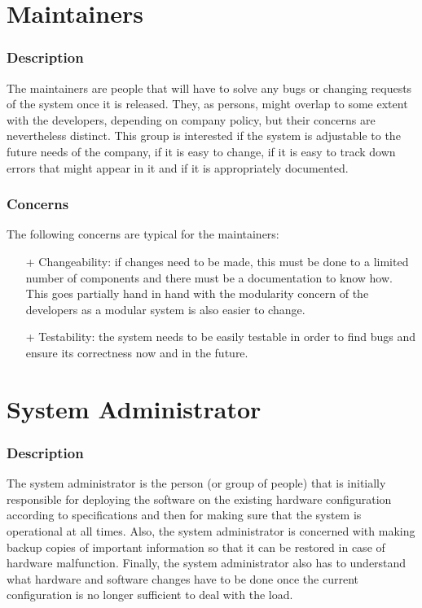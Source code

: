 \section{Maintainers}

\subsubsection{Description}
The maintainers are people that will have to solve any bugs or changing
requests of the system once it is released. They, as persons, might overlap
to some extent with the developers, depending on company policy, but
their concerns are nevertheless distinct. This group is interested if the
system is adjustable to the future needs of the company, if it is easy to
change, if it is easy to track down errors that might appear in it and if it
is appropriately documented.

\subsubsection{Concerns}
The following concerns are typical for the maintainers:
\begin{itemize}
\item[+] Changeability: if changes need to be made, this must
be done to a limited number of components and there must be a
documentation to know how. This goes partially hand in hand with the
modularity concern of the developers as a modular system is also easier
to change.
\item[+] Testability: the system needs to be easily testable in order to
find bugs and ensure its correctness now and in the future.
\end{itemize}

\section{System Administrator}

\subsubsection{Description}
The system administrator is the person (or group of people) that
is initially responsible for deploying the software on the existing hardware
configuration according to specifications and then for making sure that
the system is operational at all times. Also, the system administrator
is concerned with making backup copies of important information
so that it can be restored in case of hardware malfunction. Finally,
the system administrator also has to understand what hardware
and software changes have to be done once the current configuration is
no longer sufficient to deal with the load.

